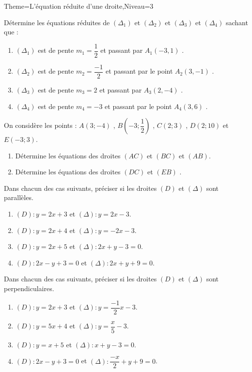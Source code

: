 \documentclass[a4paper,12pt]{article}
\begin{document}
\begin{Maquette}[Fiche]{Theme=L'équation réduite d'une droite,Niveau=3}
\begin{exercice}
Détermine les équations réduites de $(\Delta_{1})$ et $(\Delta_{2})$ et $(\Delta_{3})$ et $(\Delta_{4})$ sachant que :
\begin{enumerate}
\item  $(\Delta_{1})$ est de pente $m_{1}=\dfrac{1}{2}$ et passant par $A_{1}(-3 , 1)$ .
\item  $(\Delta_{2})$ est de pente $m_{2}=\dfrac{-1}{2}$ et passant par le point $A_{2}(3 , -1)$ .
\item  $(\Delta_{3})$ est de pente $m_{3}=2$ et passant par $A_{3}(2 , -4)$ .
\item  $(\Delta_{4})$ est de pente $m_{4}=-3$ et passant par le point $A_{4}(3 , 6)$ .
\end{enumerate}
\end{exercice}


\begin{exercice}
On considère les points : $A(3;-4)$ , $B(-3;\dfrac{1}{2})$ , $C(2;3)$ , $D(2;10)$ et $E(-3;3)$.
\begin{enumerate}
\item Détermine les équations des droites $(AC)$ et $(BC)$ et $(AB)$.
\item Détermine les équations des droites $(DC)$ et  $(EB)$ .
\end{enumerate}
\end{exercice}

\begin{exercice}
Dans chacun des cas suivants, préciser si les droites $(D)$ et $(\Delta)$  sont parallèles.
\begin{enumerate}
\item  $(D): y=2x+3$ et $(\Delta): y=2x-3$.
\item  $(D): y=2x+4$ et $(\Delta): y=-2x-3$.
\item  $(D): y=2x+5$ et $(\Delta): 2x+y-3=0$.
\item  $(D): 2x-y+3=0$ et $(\Delta): 2x+y+9=0$.
\end{enumerate}

Dans chacun des cas suivants, préciser si les droites $(D)$ et $(\Delta)$  sont perpendiculaires.
\begin{enumerate}
\item $(D): y=2x+3$ et $(\Delta): y=\dfrac{-1}{2}x-3$.
\item $(D): y=5x+4$ et $(\Delta): y=\dfrac{x}{5}-3$.
\item $(D): y=x+5$ et $(\Delta): x+y-3=0$.
\item $(D): 2x-y+3=0$ et $(\Delta): \dfrac{-x}{2}+y+9=0$.
\end{enumerate}
\end{exercice}


\end{Maquette}
\end{document}

